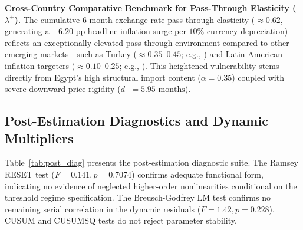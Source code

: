 \documentclass[review,12pt]{elsarticle}
\begin{document}
\textbf{Cross-Country Comparative Benchmark for Pass-Through Elasticity ($\lambda^+$).} The cumulative 6-month exchange rate pass-through elasticity ($\approx 0.62$, generating a $+6.20\text{ pp}$ headline inflation surge per $10\%$ currency depreciation) reflects an exceptionally elevated pass-through environment compared to other emerging markets---such as Turkey ($\approx 0.35$--$0.45$; e.g., \citealp{leigh2002}) and Latin American inflation targeters ($\approx 0.10$--$0.25$; e.g., \citealp{delatte2012}). This heightened vulnerability stems directly from Egypt's high structural import content ($\alpha = 0.35$) coupled with severe downward price rigidity ($d^- = 5.95\text{ months}$).

\subsection{Post-Estimation Diagnostics and Dynamic Multipliers}
\label{sec:post_diag}

Table~\ref{tab:post_diag} presents the post-estimation diagnostic suite. The Ramsey RESET test ($F = 0.141, p = 0.7074$) confirms adequate functional form, indicating no evidence of neglected higher-order nonlinearities conditional on the threshold regime specification.
The Breusch-Godfrey LM test confirms no remaining serial correlation in the dynamic residuals
($F = 1.42, p = 0.228$). CUSUM and CUSUMSQ tests do not reject parameter stability.
\end{document}
